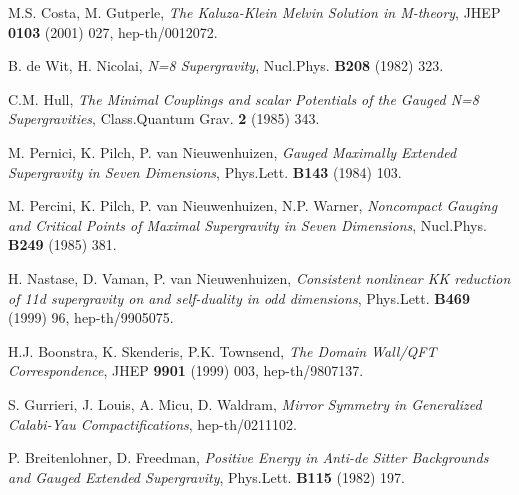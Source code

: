 \documentclass[a4paper,a4paper]{article}
\begin{document}
\begin{thebibliography}{99}
M.S. Costa, M. Gutperle, 
{\it The Kaluza-Klein Melvin Solution in M-theory}, 
JHEP {\bf 0103} (2001) 027, hep-th/0012072. 

B. de Wit, H. Nicolai, 
{\it N=8 Supergravity}, 
Nucl.Phys. {\bf B208} (1982) 323. 

C.M. Hull, 
{\it The Minimal Couplings and scalar Potentials of the Gauged N=8 Supergravities}, 
Class.Quantum Grav. {\bf 2} (1985) 343. 

M. Pernici, K. Pilch, P. van Nieuwenhuizen, 
{\it Gauged Maximally Extended Supergravity in Seven Dimensions}, 
Phys.Lett. {\bf B143} (1984) 103. 

M. Percini, K. Pilch, P. van Nieuwenhuizen, N.P. Warner, 
{\it Noncompact Gauging and Critical Points of Maximal Supergravity in Seven Dimensions}, 
Nucl.Phys. {\bf B249} (1985) 381. 

H. Nastase, D. Vaman, P. van Nieuwenhuizen, 
{\it Consistent nonlinear KK reduction of 11d supergravity on \coordHE{} and self-duality in odd 
dimensions}, 
Phys.Lett. {\bf B469} (1999) 96, hep-th/9905075. 

H.J. Boonstra, K. Skenderis, P.K. Townsend, 
{\it The Domain Wall/QFT Correspondence}, 
JHEP {\bf 9901} (1999) 003, hep-th/9807137. 

S. Gurrieri, J. Louis, A. Micu, D. Waldram, 
{\it Mirror Symmetry in Generalized Calabi-Yau Compactifications}, 
hep-th/0211102. 

P. Breitenlohner, D. Freedman, 
{\it Positive Energy in Anti-de Sitter Backgrounds and Gauged Extended Supergravity}, 
Phys.Lett. {\bf B115} (1982) 197. 


\end{thebibliography}
\end{document}
